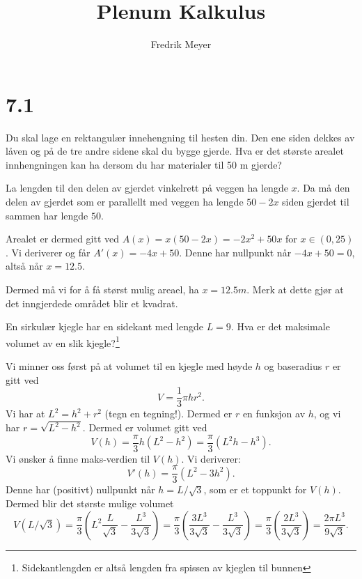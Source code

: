 \documentclass[11pt, norsk]{article}
\begin{document}
\title{Plenum Kalkulus}
\author{Fredrik Meyer}
\maketitle 

\section{7.1}


\begin{oppg}[7.1]
Du skal lage en rektangulær innehengning til hesten din. Den ene siden dekkes av låven og på de tre andre sidene skal du bygge gjerde. Hva er det største arealet innhengningen kan ha dersom du har materialer til 50 m gjerde?
\end{oppg}
\begin{losn}
La lengden til den delen av gjerdet vinkelrett på veggen ha lengde $x$. Da må den delen av gjerdet som er parallellt med veggen ha lengde $50-2x$ siden gjerdet til sammen har lengde $50$.

Arealet er dermed gitt ved $A(x)=x(50-2x)=-2x^2+50x$ for $x \in (0,25)$. Vi deriverer og får $A'(x) = -4x+50$. Denne har nullpunkt når $-4x+50=0$, altså når $x=12.5$. 

Dermed må vi for å få størst mulig areael, ha $x=12.5m$. Merk at dette gjør at det inngjerdede området blir et kvadrat.
\end{losn}

\begin{oppg}[7.5]
En sirkulær kjegle har en sidekant med lengde $L=9$. Hva er det maksimale volumet av en slik kjegle?\footnote{Sidekantlengden er altså lengden fra spissen av kjeglen til bunnen}
\end{oppg}
\begin{losn}
Vi minner oss først på at volumet til en kjegle med høyde $h$ og baseradius $r$ er gitt ved
$$
V = \frac 13 \pi hr^2.
$$	
Vi har at $L^2=h^2+r^2$ (tegn en tegning!). Dermed er $r$ en funksjon av $h$, og vi har $r=\sqrt{L^2-h^2}$. Dermed er volumet gitt ved
$$
V(h) = \frac \pi3 h(L^2-h^2) = \frac \pi 3 \left( L^2h-h^3 \right).
$$
Vi ønsker å finne maks-verdien til $V(h)$. Vi deriverer:
$$
V'(h) = \frac \pi 3 \left( L^2-3h^2 \right).
$$
Denne har (positivt) nullpunkt når $h=L/\sqrt{3}$, som er et toppunkt for $V(h)$. Dermed blir det største mulige volumet 
$$
V(L/\sqrt{3}) = \frac {\pi} {3}
 \left(
L^2 \frac{L}{\sqrt{3}} - \frac{L^3}{3\sqrt{3}} 
 \right) = 
 \frac {\pi} {3}
 \left(
\frac{3L^3}{3\sqrt{3}} - \frac{L^3}{3\sqrt{3}} 
 \right) = 
\frac {\pi} {3}
 \left(
\frac{2L^3}{3\sqrt{3}}
 \right)  = \frac{2\pi L^3}{9 \sqrt{3}}.
$$
\end{losn}
\end{document}
